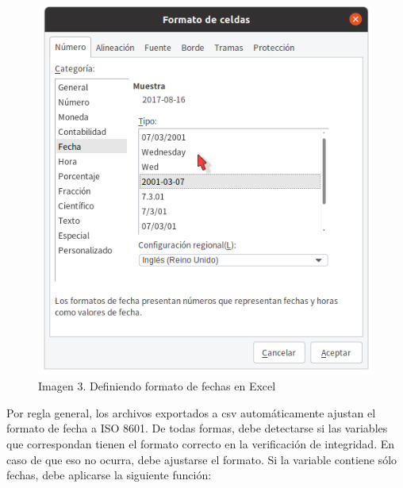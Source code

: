 \documentclass[
  spanish,
]{book}
\newenvironment{Shaded}{\begin{snugshade}}{\end{snugshade}}
\newcommand{\AttributeTok}[1]{\textcolor[rgb]{0.77,0.63,0.00}{#1}}
\newcommand{\CommentTok}[1]{\textcolor[rgb]{0.56,0.35,0.01}{\textit{#1}}}
\newcommand{\ErrorTok}[1]{\textcolor[rgb]{0.64,0.00,0.00}{\textbf{#1}}}
\newcommand{\FunctionTok}[1]{\textcolor[rgb]{0.00,0.00,0.00}{#1}}
\newcommand{\NormalTok}[1]{#1}
\newcommand{\SpecialCharTok}[1]{\textcolor[rgb]{0.00,0.00,0.00}{#1}}
\newcommand{\StringTok}[1]{\textcolor[rgb]{0.31,0.60,0.02}{#1}}
\begin{document}
\begin{figure}
\centering
\includegraphics{imagenes/Fecha.png}
\caption{Imagen 3. Definiendo formato de fechas en Excel}
\end{figure}

Por regla general, los archivos exportados a csv automáticamente ajustan el formato de fecha a ISO 8601. De todas formas, debe detectarse si las variables que correspondan tienen el formato correcto en la verificación de integridad. En caso de que eso no ocurra, debe ajustarse el formato. Si la variable contiene sólo fechas, debe aplicarse la siguiente función:

\begin{Shaded}
\end{Shaded}
\end{document}
